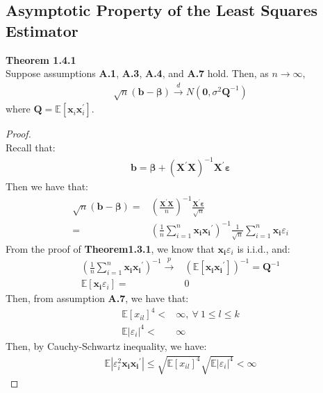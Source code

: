 \documentclass{article}
\begin{document}
\subsection{Asymptotic Property of the Least Squares Estimator}
\textbf{Theorem 1.4.1}\\
Suppose assumptions \textbf{A.1}, \textbf{A.3}, \textbf{A.4}, and \textbf{A.7} hold. Then, as $n \to \infty$,
	\begin{align*}
		\sqrt{n} (\boldsymbol{b} - \boldsymbol{\beta}) \xrightarrow{d} N(\boldsymbol{0}, \sigma^2 \boldsymbol{Q}^{-1})
	\end{align*}
where $\boldsymbol{Q} = \mathbb{E}[\boldsymbol{x}_i \boldsymbol{x}^\prime_i]$.
	\begin{proof}
		\mbox{}\\
		Recall that:
			\begin{align*}
				\boldsymbol{b} = \boldsymbol{\beta} + (\boldsymbol{X}^\prime \boldsymbol{X})^{-1} \boldsymbol{X}^\prime \boldsymbol{\varepsilon}
			\end{align*}
		Then we have that:
			\begin{align*}
				\sqrt{n}(\boldsymbol{b} - \boldsymbol{\beta}) = &\left( \frac{\boldsymbol{X}^\prime \boldsymbol{X}}{n} \right)^{-1} \frac{\boldsymbol{X}^\prime \boldsymbol{\varepsilon}}{\sqrt{n}}\\
				= &\left( \frac{1}{n} \sum\limits^n_{i=1} \boldsymbol{x_i} \boldsymbol{x_i}^\prime \right)^{-1} \frac{1}{\sqrt{n}} \sum\limits^n_{i=1} \boldsymbol{x_i} \varepsilon_i
			\end{align*}
		From  the proof of \textbf{Theorem1.3.1}, we know that $\boldsymbol{x_i} \varepsilon_i$ is i.i.d., and:
			\begin{align*}
				\left( \frac{1}{n} \sum\limits^n_{i=1} \boldsymbol{x_i} \boldsymbol{x_i}^\prime \right)^{-1} \xrightarrow{p} &(\mathbb{E}[\boldsymbol{x_i} \boldsymbol{x_i}^\prime])^{-1} =\boldsymbol{Q}^{-1}\\
				\mathbb{E}[\boldsymbol{x_i}\varepsilon_i] = &0
			\end{align*}
		Then, from assumption \textbf{A.7}, we have that:
			\begin{align*}
				\mathbb{E}[x_{il}]^4 < &\infty,\ \forall\ 1 \leq l \leq k\\
				\mathbb{E}|\varepsilon_i|^4 < &\infty
			\end{align*}
		Then, by Cauchy-Schwartz inequality, we have:
			\begin{align*}
				\mathbb{E}|\varepsilon^2_i \boldsymbol{x_i} \boldsymbol{x_i}^\prime | \leq \sqrt{\mathbb{E}[x_{il}]^4} \sqrt{\mathbb{E}|\varepsilon_i|^4} < \infty

\end{align*}
\end{proof}
\end{document}
